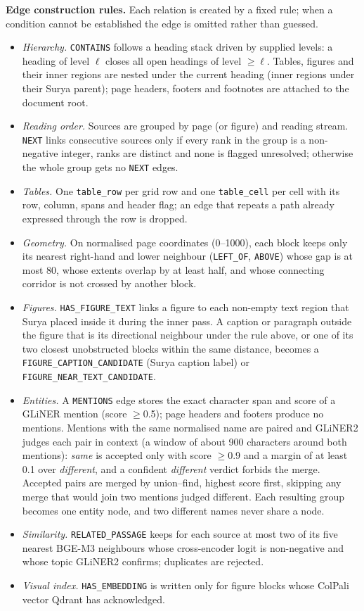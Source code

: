 \documentclass[conference]{IEEEtran}
\begin{document}
\textbf{Edge construction rules.} Each relation is created by a fixed rule; when a condition cannot be established the edge is omitted rather than guessed.
\begin{itemize}
\item \emph{Hierarchy.} \texttt{CONTAINS} follows a heading stack driven by supplied levels: a heading of level $\ell$ closes all open headings of level $\geq\ell$. Tables, figures and their inner regions are nested under the current heading (inner regions under their Surya parent); page headers, footers and footnotes are attached to the document root.
\item \emph{Reading order.} Sources are grouped by page (or figure) and reading stream. \texttt{NEXT} links consecutive sources only if every rank in the group is a non-negative integer, ranks are distinct and none is flagged unresolved; otherwise the whole group gets no \texttt{NEXT} edges.
\item \emph{Tables.} One \texttt{table\_row} per grid row and one \texttt{table\_cell} per cell with its row, column, spans and header flag; an edge that repeats a path already expressed through the row is dropped.
\item \emph{Geometry.} On normalised page coordinates (0--1000), each block keeps only its nearest right-hand and lower neighbour (\texttt{LEFT\_OF}, \texttt{ABOVE}) whose gap is at most 80, whose extents overlap by at least half, and whose connecting corridor is not crossed by another block.
\item \emph{Figures.} \texttt{HAS\_FIGURE\_TEXT} links a figure to each non-empty text region that Surya placed inside it during the inner pass. A caption or paragraph outside the figure that is its directional neighbour under the rule above, or one of its two closest unobstructed blocks within the same distance, becomes a \texttt{FIGURE\_CAPTION\_CANDIDATE} (Surya caption label) or \texttt{FIGURE\_NEAR\_TEXT\_CANDIDATE}.
\item \emph{Entities.} A \texttt{MENTIONS} edge stores the exact character span and score of a GLiNER mention (score $\geq$0.5); page headers and footers produce no mentions. Mentions with the same normalised name are paired and GLiNER2 judges each pair in context (a window of about 900 characters around both mentions): \emph{same} is accepted only with score $\geq$0.9 and a margin of at least 0.1 over \emph{different}, and a confident \emph{different} verdict forbids the merge. Accepted pairs are merged by union--find, highest score first, skipping any merge that would join two mentions judged different. Each resulting group becomes one entity node, and two different names never share a node.
\item \emph{Similarity.} \texttt{RELATED\_PASSAGE} keeps for each source at most two of its five nearest BGE-M3 neighbours whose cross-encoder logit is non-negative and whose topic GLiNER2 confirms; duplicates are rejected.
\item \emph{Visual index.} \texttt{HAS\_EMBEDDING} is written only for figure blocks whose ColPali vector Qdrant has acknowledged.
\end{itemize}
\end{document}
